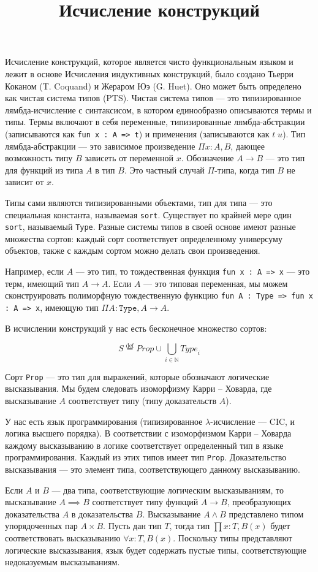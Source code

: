 \documentclass[12pt]{article}
\title{Исчисление конструкций}
\begin{document}
Исчисление конструкций, которое является чисто функциональным языком и лежит в основе Исчисления индуктивных конструкций, было создано Тьерри Коканом (T. Coquand) и Жераром Юэ (G. Huet). Оно может быть определено как чистая система типов (PTS). Чистая система типов --- это типизированное лямбда-исчисление с синтаксисом, в котором единообразно описываются термы и типы. Термы включают в себя переменные, типизированные лямбда-абстракции (записываются как \texttt{fun x : A => t}) и применения (записываются как $t\; u$). Тип лямбда-абстракции --- это зависимое произведение $\Pi x : A, B$, дающее возможность типу $B$ зависеть от переменной $x$. Обозначение $A \rightarrow B$ --- это тип для функций из типа $A$ в тип $B$. Это частный случай $\Pi$-типа, когда тип $B$ не зависит от $x$.

Типы сами являются типизированными объектами, тип для типа --- это специальная константа, называемая \texttt{sort}. Существует по крайней мере один \texttt{sort}, называемый \texttt{Type}. Разные системы типов в своей основе имеют разные множества сортов: каждый сорт соответствует определенному универсуму объектов, также с каждым сортом можно делать свои произведения.

Например, если $A$ --- это тип, то тождественная функция \texttt{fun x : A => x} --- это терм, имеющий тип $A \rightarrow A$. Если $A$ --- это типовая переменная, мы можем сконструировать полиморфную тождественную функцию \texttt{fun A : Type => fun x : A => x}, имеющую тип $\Pi A : \texttt{Type}, A \rightarrow A$.

В исчислении конструкций у нас есть бесконечное множество сортов:

$$
S \stackrel{\text{def}}{=} \mathit{Prop} \cup \bigcup_{i \in \mathbb{N}} \mathit{Type}_i
$$

Сорт \texttt{Prop} --- это тип для выражений, которые обозначают логические высказывания. Мы будем следовать изоморфизму Карри -- Ховарда, где высказывание $A$ соответствует типу (типу доказательств $A$).

У нас есть язык программирования (типизированное $\lambda$-исчисление --- CIC, и логика высшего порядка). В соответствии с изоморфизмом Карри -- Ховарда каждому высказыванию в логике соответствует определенный тип в языке программирования. Каждый из этих типов имеет тип \texttt{Prop}. Доказательство высказывания --- это элемент типа, соответствующего данному высказыванию.

Если $A$ и $B$ --- два типа, соответствующие логическим высказываниям, то высказывание $A \implies B$ соответствует типу функций $A \rightarrow B$, преобразующих доказательства $A$ в доказательства $B$. Высказывание $A \land B$ представлено типом упорядоченных пар $A \times B$. Пусть дан тип $T$, тогда тип $\prod x : T, B(x)$ будет соответствовать высказыванию $\forall x : T, B(x)$. Поскольку типы представляют логические высказывания, язык будет содержать пустые типы, соответствующие недоказуемым высказываниям.
\end{document}
